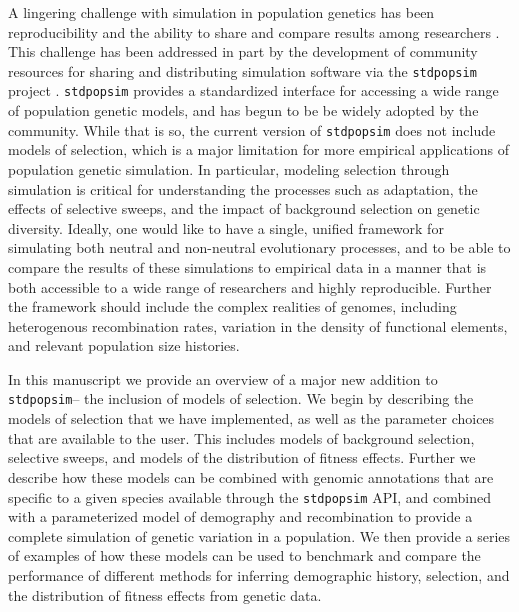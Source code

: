 \documentclass[hidelinks]{article}
\newcommand{\stdpopsim}{\texttt{stdpopsim}\xspace}
\begin{document}
    A lingering challenge with simulation in population genetics has been
    reproducibility and the ability to share and compare results among 
    researchers \citep[][e.g.,]{ragsdale2020lessons}.
    This challenge has been addressed in part by the development
    of community resources for sharing and distributing simulation software
    via the \stdpopsim project \citep{adrion2020community}. \stdpopsim
    provides a standardized interface for accessing a wide range of
    population genetic models, and has begun to be be widely adopted by the community. %
    While that is so, the current version of \stdpopsim does not include
    models of selection, which is a major limitation for more empirical
    applications of population genetic simulation. In particular, modeling selection
    through simulation is critical for understanding the processes such
    as adaptation, the effects of selective sweeps, and the impact of
    background selection on genetic diversity. Ideally, one would like
    to have a single, unified framework for simulating both neutral and
    non-neutral evolutionary processes, and to be able to compare the
    results of these simulations to empirical data in a manner that is
    both accessible to a wide range of researchers and highly reproducible. 
    Further the framework should include the complex realities of 
    genomes, including heterogenous recombination rates, 
    variation in the density of functional elements, and relevant
    population size histories. 

    In this manuscript we provide an overview of a major new addition
    to \stdpopsim-- the inclusion of models of selection.
    We begin by describing the models of selection that we have implemented,
    as well as the parameter choices that are available to the user.
    This includes models of background selection, selective sweeps, and
    models of the distribution of fitness effects.
    Further we describe how these models can be combined with genomic
    annotations that are specific to a given species available
    through the \stdpopsim API, and combined with a parameterized model of
    demography and recombination to provide a complete simulation of
    genetic variation in a population.
    We then provide a series of examples of how these models can be used
    to benchmark and compare the performance of different methods for
    inferring demographic history, selection, and the distribution of
    fitness effects from genetic data. 
\end{document}

